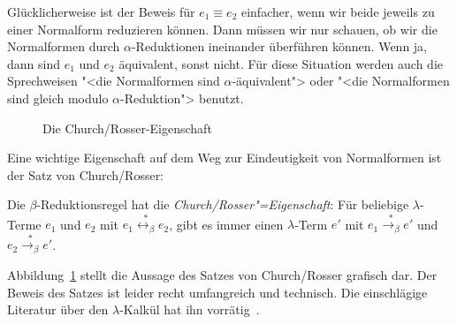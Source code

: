 Glücklicherweise ist der Beweis für $e_1 \equiv e_2$ einfacher, wenn
wir beide jeweils zu einer Normalform reduzieren können.  Dann müssen
wir nur schauen, ob wir die Normalformen durch $\alpha$-Reduktionen
ineinander überführen können.  Wenn ja, dann sind $e_1$ und $e_2$
äquivalent, sonst nicht.  Für diese Situation werden auch die
Sprechweisen "<die Normalformen sind $\alpha$-äquivalent"> oder "<die
Normalformen sind gleich modulo $\alpha$-Reduktion"> benutzt.

\begin{figure}[tb]
  \begin{center}
    \caption{Die Church/Rosser-Eigenschaft}
    \label{fig:church-rosser}
  \end{center}
\end{figure}

Eine wichtige Eigenschaft auf dem Weg zur Eindeutigkeit von
Normalformen ist der Satz von Church/Rosser:
%
\begin{satz}
  \label{satz:church-rosser}
  Die $\beta$-Reduktionsregel hat die 
  \textit{Church/Rosser"=Eigenschaft}:  Für
  beliebige $\lambda$-Terme $e_1$ und  $e_2$ mit
  $e_1 \overset{\ast}{\leftrightarrow_\beta} e_2$,
  gibt es immer einen $\lambda$-Term $e'$ mit
  $e_1\overset{\ast}{\rightarrow_\beta} e'$ und
  $e_2\overset{\ast}{\rightarrow_\beta} e'$.
\end{satz}
%
Abbildung~\ref{fig:church-rosser} stellt die Aussage des Satzes von
Church/Rosser grafisch dar.
Der Beweis des Satzes ist leider recht umfangreich und technisch.
Die einschlägige Literatur über den $\lambda$-Kalkül hat ihn
vorrätig~\cite{HindleySeldin1986}.

